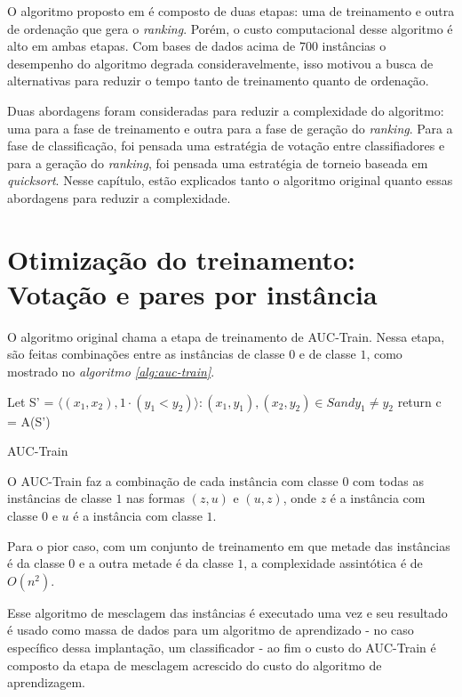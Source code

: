 O algoritmo proposto em \cite{langford08} é composto de duas etapas: uma de treinamento e outra de ordenação que gera o \emph{ranking}. Porém, o custo computacional desse algoritmo é alto em ambas etapas. Com bases de dados acima de $700$ instâncias o desempenho do algoritmo degrada consideravelmente, isso motivou a busca de alternativas para reduzir o tempo tanto de treinamento quanto de ordenação.

Duas abordagens foram consideradas para reduzir a complexidade do algoritmo: uma para a fase de treinamento e outra para a fase de geração do \emph{ranking}. Para a fase de classificação, foi pensada uma estratégia de votação entre classifiadores e para a geração do \emph{ranking}, foi pensada uma estratégia de torneio baseada em \emph{quicksort}. Nesse capítulo, estão explicados tanto o algoritmo original quanto essas abordagens para reduzir a complexidade.

\section{Otimização do treinamento: Votação e pares por instância}
O algoritmo original chama a etapa de treinamento de AUC-Train. Nessa etapa, são feitas combinações entre as instâncias de classe $0$ e de classe $1$, como mostrado no \emph{ algoritmo \ref{alg:auc-train}}. 

\begin{algorithm}
\begin{algorithmic}

\STATE Let S' = ${\langle(x_1, x_2), 1\cdot(y_1 < y_2)\rangle :(x_1, y_1), (x_2, y_2) \in S and y_1 \neq y_2}$
\STATE return c = A(S')

\caption{AUC-Train}
\label{alg:auc-train}

\end{algorithmic}
\end{algorithm}

O AUC-Train faz a combinação de cada instância com classe $0$ com todas as instâncias de classe $1$ nas formas $(z, u)$ e $(u, z)$, onde $z$ é a instância com classe $0$ e $u$ é a instância com classe $1$.

Para o pior caso, com um conjunto de treinamento em que metade das instâncias é da classe $0$ e a outra metade é da classe $1$, a complexidade assintótica é de $O(n^2)$.

Esse algoritmo de mesclagem das instâncias é executado uma vez e seu resultado é usado como massa de dados para um algoritmo de aprendizado - no caso específico dessa implantação, um classificador - ao fim o custo do AUC-Train é composto da etapa de mesclagem acrescido do custo do algoritmo de aprendizagem.

